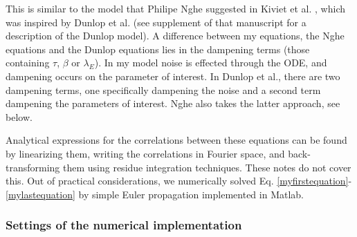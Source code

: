 This is similar to the model that Philipe Nghe suggested in Kiviet et al. \cite{Kiviet2014}, which was inspired by Dunlop et al. \cite{Dunlop2008} (see supplement of that manuscript for a description of the Dunlop model).
%
A difference between my equations, the Nghe equations and the Dunlop equations lies in the dampening terms (those containing $\tau$, $\beta$ or $\lambda_E$). In my model noise is effected through the ODE, and dampening occurs on the parameter of interest. In Dunlop et al., there are two dampening terms, one specifically dampening the noise and a second term dampening the parameters of interest. Nghe also takes the latter approach, see below.

Analytical expressions for the correlations between these equations can be found by linearizing them, writing the correlations in Fourier space, and back-transforming them using residue integration techniques. 
These notes do not cover this. %
Out of practical considerations, we numerically solved Eq. \ref{myfirstequation}-\ref{mylastequation} by simple Euler propagation implemented in Matlab.

\subsubsection*{Settings of the numerical implementation}

